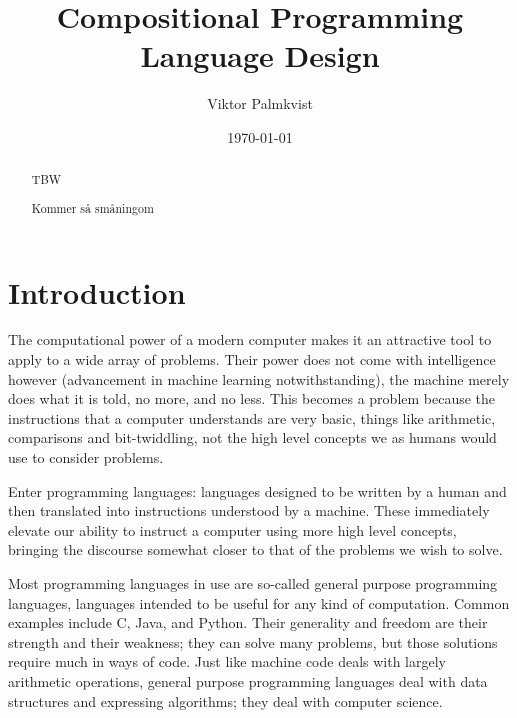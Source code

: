 \documentclass{kththesis}
\title{Compositional Programming Language Design}
\author{Viktor Palmkvist}
\date{\today}
\begin{document}
\frontmatter

\titlepage

\begin{abstract}
TBW
\end{abstract}


\begin{otherlanguage}{swedish}
\begin{abstract}
Kommer så småningom
\end{abstract}
\end{otherlanguage}


\tableofcontents


\mainmatter


\chapter{Introduction} \label{sec:introduction}

The computational power of a modern computer makes it an attractive tool to apply to a wide array of problems. Their power does not come with intelligence however (advancement in machine learning notwithstanding), the machine merely does what it is told, no more, and no less. This becomes a problem because the instructions that a computer understands are very basic, things like arithmetic, comparisons and bit-twiddling, not the high level concepts we as humans would use to consider problems.

Enter programming languages: languages designed to be written by a human and then translated into instructions understood by a machine. These immediately elevate our ability to instruct a computer using more high level concepts, bringing the discourse somewhat closer to that of the problems we wish to solve.

Most programming languages in use are so-called general purpose programming languages, languages intended to be useful for any kind of computation. Common examples include C, Java, and Python. Their generality and freedom are their strength and their weakness; they can solve many problems, but those solutions require much in ways of code. Just like machine code deals with largely arithmetic operations, general purpose programming languages deal with data structures and expressing algorithms; they deal with computer science.
\end{document}
